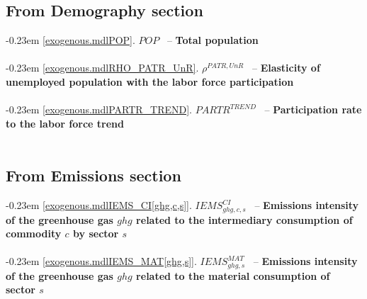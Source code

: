 \documentclass[12pt]{article}
\numberwithin{equation}{section}
\begin{document}
\subsection{From Demography section}




\noindent \kern-0.23em \noindent \begingroup {} \label{exogenous.mdlPOP}\ref{exogenous.mdlPOP}.
         
        \ensuremath{POP}~ \endgroup -- \noindent \textbf{Total population}  \\ \\[-8pt]



\noindent \kern-0.23em \noindent \begingroup {} \label{exogenous.mdlRHO_PATR_UnR}\ref{exogenous.mdlRHO_PATR_UnR}.
         
        \ensuremath{\rho^{PATR,UnR}}~ \endgroup -- \noindent \textbf{Elasticity of unemployed population with the labor force participation}  \\ \\[-8pt]



\noindent \kern-0.23em \noindent \begingroup {} \label{exogenous.mdlPARTR_TREND}\ref{exogenous.mdlPARTR_TREND}.
         
        \ensuremath{PARTR^{TREND}}~ \endgroup -- \noindent \textbf{Participation rate to the labor force trend}  \\ \\[-8pt]










\subsection{From Emissions section}




\noindent \kern-0.23em \noindent \begingroup {} \label{exogenous.mdlIEMS_CI[ghg,c,s]}\ref{exogenous.mdlIEMS_CI[ghg,c,s]}.
         
        \ensuremath{IEMS^{CI}_{ghg, c, s}}~ \endgroup -- \noindent \textbf{Emissions intensity of the greenhouse gas $ghg$ related to the intermediary consumption of commodity $c$ by sector $s$}  \\ \\[-8pt]


\noindent \kern-0.23em \noindent \begingroup {} \label{exogenous.mdlIEMS_MAT[ghg,s]}\ref{exogenous.mdlIEMS_MAT[ghg,s]}.
         
        \ensuremath{IEMS^{MAT}_{ghg, s}}~ \endgroup -- \noindent \textbf{Emissions intensity of the greenhouse gas $ghg$ related to the material consumption of sector $s$}  \\ \\[-8pt]
\end{document}
